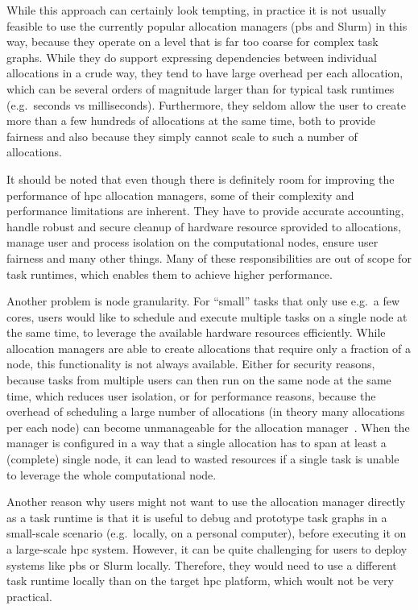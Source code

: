 While this approach can certainly look tempting, in practice it is not usually feasible to use the
currently popular allocation managers (\gls{pbs} and Slurm) in this way, because
they operate on a level that is far too coarse for complex task graphs. While they do support
expressing dependencies between individual allocations in a crude way, they tend to have large
overhead per each allocation, which can be several orders of magnitude
larger than for typical task runtimes (e.g.\ seconds vs milliseconds). Furthermore, they seldom
allow the user to create more than a few hundreds of allocations at the same time, both to provide
fairness and also because they simply cannot scale to such a number of allocations.

It should be noted that even though there is definitely room for improving the performance of
\gls{hpc} allocation managers, some of their complexity and performance
limitations are inherent. They have to provide accurate accounting, handle robust and secure
cleanup of hardware resource sprovided to allocations, manage user and process isolation on the
computational nodes, ensure user fairness and many other things. Many of these responsibilities are
out of scope for task runtimes, which enables them to achieve higher performance.

Another problem is node granularity. For ``small'' tasks that only use e.g.\ a few cores, users
would like to schedule and execute multiple tasks on a single node at the same time, to leverage
the available hardware resources efficiently. While allocation managers are able to create
allocations that require only a fraction of a node, this functionality is not always available.
Either for security reasons, because tasks from multiple users can then run on the same node at the
same time, which reduces user isolation, or for performance reasons, because the overhead of
scheduling a large number of allocations (in theory many allocations per each node) can become
unmanageable for the allocation manager~\cite{it4i_node_scheduling_policy}. When the manager is configured
in a way that a single allocation has to span at least a (complete) single node, it can lead to
wasted resources if a single task is unable to leverage the whole computational node.

Another reason why users might not want to use the allocation manager directly as a task runtime is
that it is useful to debug and prototype task graphs in a small-scale scenario (e.g.\ locally, on a
personal computer), before executing it on a large-scale \gls{hpc} system.
However, it can be quite challenging for users to deploy systems like \gls{pbs}
or Slurm locally. Therefore, they would need to use a different task runtime locally than on the
target \gls{hpc} platform, which woult not be very practical.

